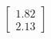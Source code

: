\documentclass[preview]{standalone}
\begin{document}
\begin{align*}
\begin{bmatrix} 1.82 \\ 2.13 \end{bmatrix}
\end{align*}
\end{document}
